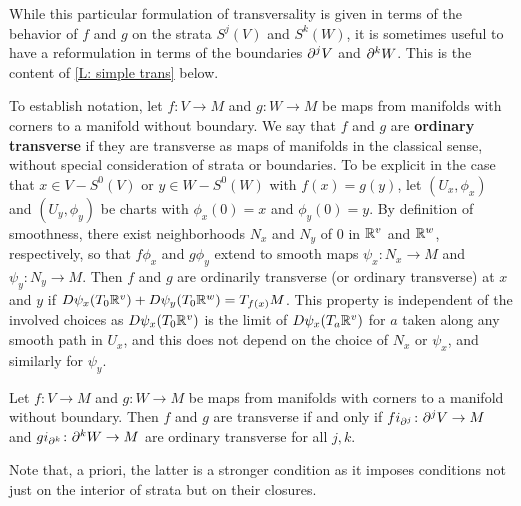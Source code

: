 While this particular formulation of transversality is given in terms of the behavior of $f$ and $g$ on the strata $S^j(V)$ and $S^k(W)$, it is sometimes useful to have a reformulation in terms of the boundaries $\partial^j V$ and $\partial^kW$.
This is the content of \cref{L: simple trans} below.

To establish notation, let $f \colon V\to M$ and $g \colon W\to M$ be maps from manifolds with corners to a manifold without boundary.
We say that $f$ and $g$ are \textbf{ordinary transverse} if they are transverse as maps of manifolds in the classical sense, without special consideration of strata or boundaries.
To be explicit in the case that $x\in V-S^0(V)$ or $y\in W-S^0(W)$ with $f(x)=g(y)$, let $(U_x,\phi_x)$ and $(U_y,\phi_y)$ be charts with $\phi_x(0)=x$ and $\phi_y(0)=y$.
By definition of smoothness, there exist neighborhoods $N_x$ and $N_y$ of $0$ in $\mathbb{R}^v$ and $\mathbb{R}^w$, respectively, so that $f\phi_x$ and $g\phi_y$ extend to smooth maps $\psi_x \colon N_x\to M$ and $\psi_y \colon N_y\to M$.
Then $f$ and $g$ are ordinarily transverse (or ordinary transverse)
at $x$ and $y$ if $D\psi_x(T_0 \mathbb{R}^v)+D\psi_y(T_0\mathbb{R}^w)=T_{f(x)}M$.
This property is independent of the involved choices as $D\psi_x(T_0 \mathbb{R}^v)$ is the limit of $D\psi_x(T_{a} \mathbb{R}^v)$ for $a$ taken along any smooth path in $U_x$, and this does not depend on the choice of $N_x$ or $\psi_x$, and similarly for $\psi_y$.

\begin{lemma}\label{L: simple trans}
	Let $f \colon V\to M$ and $g \colon W\to M$ be maps from manifolds with corners to a manifold without boundary.
	Then $f$ and $g$ are transverse if and only if $fi_{\partial^j} \colon \partial^jV\to M$ and $gi_{\partial^k} \colon \partial^kW \to M$ are ordinary transverse for all $j,k$.
\end{lemma}

Note that, a priori, the latter is a stronger condition as it imposes conditions not just on the interior of strata but on their closures.

